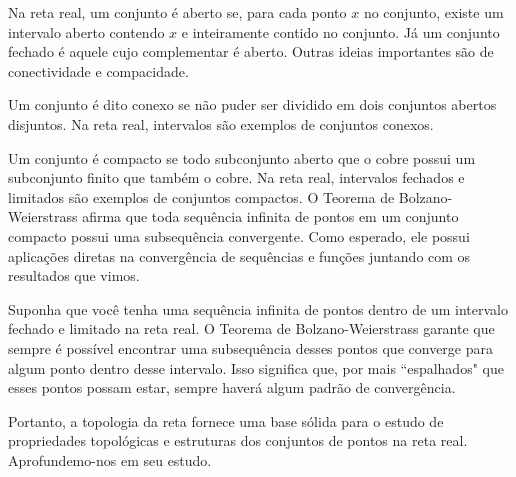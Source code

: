 \documentclass[analysis_notes.tex]{subfiles}
\begin{document}
\begin{center}
\end{center}

Na reta real, um conjunto é aberto se, para cada ponto $x$ no conjunto, existe um intervalo aberto contendo $x$ e inteiramente contido no conjunto. Já um conjunto fechado é aquele cujo complementar é aberto.
Outras ideias importantes s\~ao de conectividade e compacidade.

Um conjunto é dito conexo se não puder ser dividido em dois conjuntos abertos disjuntos. Na reta real, intervalos são exemplos de conjuntos conexos.

Um conjunto é compacto se todo subconjunto aberto que o cobre possui um subconjunto finito que também o cobre. Na reta real, intervalos fechados e limitados são exemplos de conjuntos compactos.
O Teorema de Bolzano-Weierstrass afirma que toda sequência infinita de pontos em um conjunto compacto possui uma subsequência convergente. Como esperado,
ele possui aplica\c c\~oes diretas na converg\^encia de sequ\^encias e fun\c c\~oes juntando com os resultados que vimos.

Suponha que você tenha uma sequência infinita de pontos dentro de um intervalo fechado e limitado na reta real. O Teorema de Bolzano-Weierstrass garante que sempre é possível encontrar uma subsequência desses pontos que converge para algum ponto dentro desse intervalo. Isso significa que, por mais ``espalhados" que esses pontos possam estar, sempre haverá algum padrão de convergência.

Portanto, a topologia da reta fornece uma base sólida para o estudo de propriedades topológicas e estruturas dos conjuntos de pontos na reta real. Aprofundemo-nos
em seu estudo.
\end{document}
